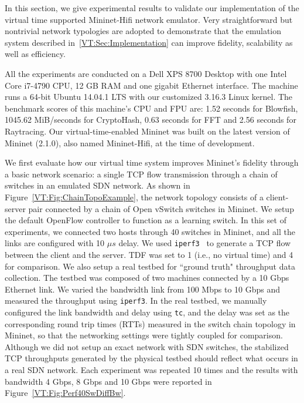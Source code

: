 \label{VT:Sec:Experiments}

In this section, we give experimental results to validate our implementation of the virtual time supported Mininet-Hifi network emulator.
Very straightforward but nontrivial network typologies are adopted to demonstrate
that the emulation system described in~\ref{VT:Sec:Implementation} can improve fidelity, scalability as well as efficiency. 

All the experiments are conducted on a Dell XPS 8700 Desktop with one Intel Core i7-4790 CPU,
12 GB RAM and one gigabit Ethernet interface. The machine runs a 64-bit Ubuntu 14.04.1 LTS with our customized 3.16.3 Linux kernel.
The benchmark scores of this machine's CPU and FPU are: 1.52 seconds for Blowfish, 1045.62 MiB/seconds for CryptoHash,
0.63 seconds for FFT and 2.56 seconds for Raytracing. Our virtual-time-enabled Mininet was built on the latest version of Mininet (2.1.0),
also named Mininet-Hifi, at the time of development.

We first evaluate how our virtual time system improves Mininet's fidelity through a basic network scenario:
a single TCP flow transmission through a chain of switches in an emulated SDN network.
As shown in Figure~\ref{VT:Fig:ChainTopoExample}, the network topology consists of a client-server pair connected by a chain of Open vSwitch switches in Mininet.
We setup the default OpenFlow controller to function as a learning switch.
In this set of experiments, we connected two hosts through 40 switches in Mininet, and all the links are configured with 10 $\mu s$ delay.
We used \texttt{iperf3}~\cite{iperf3} to generate a TCP flow between the client and the server.
TDF was set to 1 (i.e., no virtual time) and 4 for comparison. We also setup a real testbed for ``ground truth" throughput data collection.
The testbed was composed of two machines connected by a 10 Gbps Ethernet link.
We varied the bandwidth link from 100 Mbps to 10 Gbps and measured the throughput using \texttt{iperf3}.
In the real testbed, we manually configured the link bandwidth and delay using \texttt{tc},
and the delay was set as the corresponding round trip times (RTTs) measured in the switch chain topology in Mininet,
so that the networking settings were tightly coupled for comparison.
Although we did not setup an exact network with SDN switches,
the stabilized TCP throughputs generated by the physical testbed should reflect what occurs in a real SDN network.
Each experiment was repeated 10 times and the results with bandwidth 4 Gbps, 8 Gbps and 10 Gbps were reported in Figure~\ref{VT:Fig:Perf40SwDiffBw}. 

